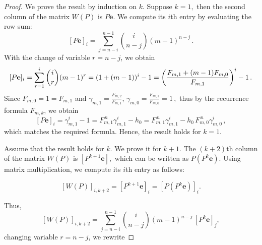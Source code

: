 \documentclass[11pt,oneside]{article}
\theoremstyle{plain}
\theoremstyle{plain}
\theoremstyle{definition}
\numberwithin{figure}{section}
\theoremstyle{remark}
\numberwithin{equation}{section}
\begin{document}
	\begin{proof} We prove the result by induction on $k$. Suppose $ k = 1,$ then the second column of the matrix $W(P)$ is $P\mathbf{e}.$  We compute its $i$th entry by evaluating the row sum:
		$$
		\left[ P \mathbf{e} \right]_i =\sum_{j=n-i}^{n-1} \binom{i}{n-j} (m-1)^{n-j}\,.
		$$
		With the change of variable $r = n - j$, we obtain
		$$
		[P\mathbf{e}]_i 
		= \sum_{r=1}^{i} \binom{i}{r} (m-1)^r 
		= (1 + (m-1))^i - 1 \\
		= \left( \frac{F_{m,1} + (m-1)F_{m,0}}{F_{m,1}} \right)^i - 1 \,.$$
		Since $F_{m,0} = 1 = F_{m,1}$ and $\gamma_{m,1} = \frac{F_{m,2}}{F_{m,1}}$, $\gamma_{m,0} = \frac{F_{m,1}}{F_{m,0}} = 1\,,$ thus by the recurrence formula $F_{m,k}$, we obtain
		\[
		[P\mathbf{e}]_i = \gamma_{m,1}^i - 1 = F_{m,1}^{\,n} \gamma_{m,1}^i - h_0 =  F_{m,1}^{\,n}\gamma_{m,1}^i - h_0\,F_{m,0}^{\,n}\gamma_{m,0}^i\,,
		\]
		which matches the required formula. Hence, the result holds for $k = 1.$ 
		
		
		
		Assume that the result holds for $ k.$ We prove it for $k+1$. The $(k+2)$th column of the matrix $W(P)$ is  $[P^{k+1}\mathbf{e}],$ which can be written as $P(P^k\mathbf{e}).$ 
		Using matrix multiplication, we compute its $i$th entry as follows:
		
		\[
		[W(P)]_{i,k+2} =  \left[ P^{k+1} \mathbf{e} \right]_i = \left[ P (P^k \mathbf{e}) \right]_i.
		\]
		
		Thus,
		\[
		\left[ W(P)\right]_{i,{k+2}}
		= \sum_{j=n-i}^{n-1} \binom{i}{n-j} (m-1)^{n-j} \,\left[ P^{k} \mathbf{e} \right]_j,
		\]
		\noindent
		changing variable $r = n - j$, we rewrite
		

\end{proof}
\end{document}

